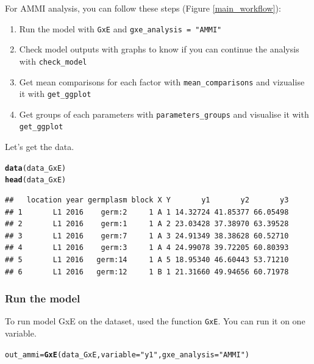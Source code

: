 \documentclass{book}\usepackage[]{graphicx}\usepackage[]{color}
\makeatletter
\newcommand{\hlstr}[1]{\textcolor[rgb]{0.192,0.494,0.8}{#1}}%
\newcommand{\hlstd}[1]{\textcolor[rgb]{0.345,0.345,0.345}{#1}}%
\newcommand{\hlkwb}[1]{\textcolor[rgb]{0.69,0.353,0.396}{#1}}%
\newcommand{\hlkwc}[1]{\textcolor[rgb]{0.333,0.667,0.333}{#1}}%
\newcommand{\hlkwd}[1]{\textcolor[rgb]{0.737,0.353,0.396}{\textbf{#1}}}%
\newenvironment{kframe}{%
 \def\at@end@of@kframe{}%
 \ifinner\ifhmode%
  \def\at@end@of@kframe{\end{minipage}}%
  \begin{minipage}{\columnwidth}%
 \fi\fi%
 \def\FrameCommand##1{\hskip\@totalleftmargin \hskip-\fboxsep
 \colorbox{shadecolor}{##1}\hskip-\fboxsep
     \hskip-\linewidth \hskip-\@totalleftmargin \hskip\columnwidth}%
 \MakeFramed {\advance\hsize-\width
   \@totalleftmargin\z@ \linewidth\hsize
   \@setminipage}}%
 {\par\unskip\endMakeFramed%
 \at@end@of@kframe}
\newenvironment{knitrout}{}{} %
\makeatother
\begin{document}
For AMMI analysis, you can follow these steps (Figure \ref{main_workflow}):

\begin{enumerate}
\item Run the model with \texttt{GxE} and \texttt{gxe\_analysis = "AMMI"}
\item Check model outputs with graphs to know if you can continue the analysis with \texttt{check\_model}
\item Get mean comparisons for each factor with \texttt{mean\_comparisons} and vizualise it with \texttt{get\_ggplot}
\item Get groups of each parameters with \texttt{parameters\_groups} and visualise it with \texttt{get\_ggplot}
\end{enumerate}

Let's get the data.

\begin{knitrout}
\color{fgcolor}\begin{kframe}
\begin{alltt}
\hlkwd{data}\hlstd{(data_GxE)}
\hlkwd{head}\hlstd{(data_GxE)}
\end{alltt}
\begin{verbatim}
##   location year germplasm block X Y       y1       y2       y3
## 1       L1 2016    germ:2     1 A 1 14.32724 41.85377 66.05498
## 2       L1 2016    germ:1     1 A 2 23.03428 37.38970 63.39528
## 3       L1 2016    germ:7     1 A 3 24.91349 38.38628 60.52710
## 4       L1 2016    germ:3     1 A 4 24.99078 39.72205 60.80393
## 5       L1 2016   germ:14     1 A 5 18.95340 46.60443 53.71210
## 6       L1 2016   germ:12     1 B 1 21.31660 49.94656 60.71978
\end{verbatim}
\end{kframe}
\end{knitrout}


\subsubsection{Run the model}
To run model GxE on the dataset, used the function \texttt{GxE}.
You can run it on one variable.

\begin{knitrout}
\color{fgcolor}\begin{kframe}
\begin{alltt}
\hlstd{out_ammi} \hlkwb{=} \hlkwd{GxE}\hlstd{(data_GxE,} \hlkwc{variable} \hlstd{=} \hlstr{"y1"}\hlstd{,} \hlkwc{gxe_analysis} \hlstd{=} \hlstr{"AMMI"}\hlstd{)}
\end{alltt}


{\ttfamily\noindent\itshape\color{messagecolor}{\#\# AMMI model done for y1}}\end{kframe}
\end{knitrout}
\end{document}
